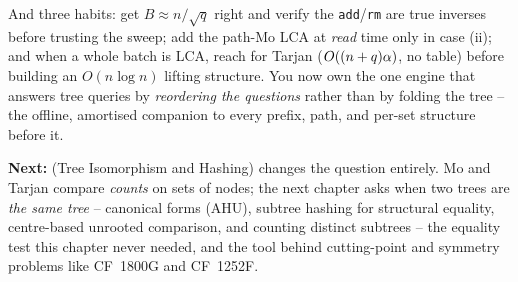 \begin{lastword}
\medskip
And three habits: get \(B\approx n/\sqrt q\) right and verify the \texttt{add}/\texttt{rm}
are true inverses before trusting the sweep; add the path-Mo LCA at \emph{read} time only
in case (ii); and when a whole batch is LCA, reach for Tarjan (\(O((n+q)\alpha)\), no
table) before building an \(O(n\log n)\) lifting structure. You now own the one engine that
answers tree queries by \emph{reordering the questions} rather than by folding the tree --
the offline, amortised companion to every prefix, path, and per-set structure before it.

\medskip
\textbf{Next:}  (Tree Isomorphism and Hashing) changes the question entirely.
Mo and Tarjan compare \emph{counts} on sets of nodes; the next chapter asks when two trees
are \emph{the same tree} -- canonical forms (AHU), subtree hashing for structural equality,
centre-based unrooted comparison, and counting distinct subtrees -- the equality test this
chapter never needed, and the tool behind cutting-point and symmetry problems like CF~1800G
and CF~1252F.
\end{lastword}
